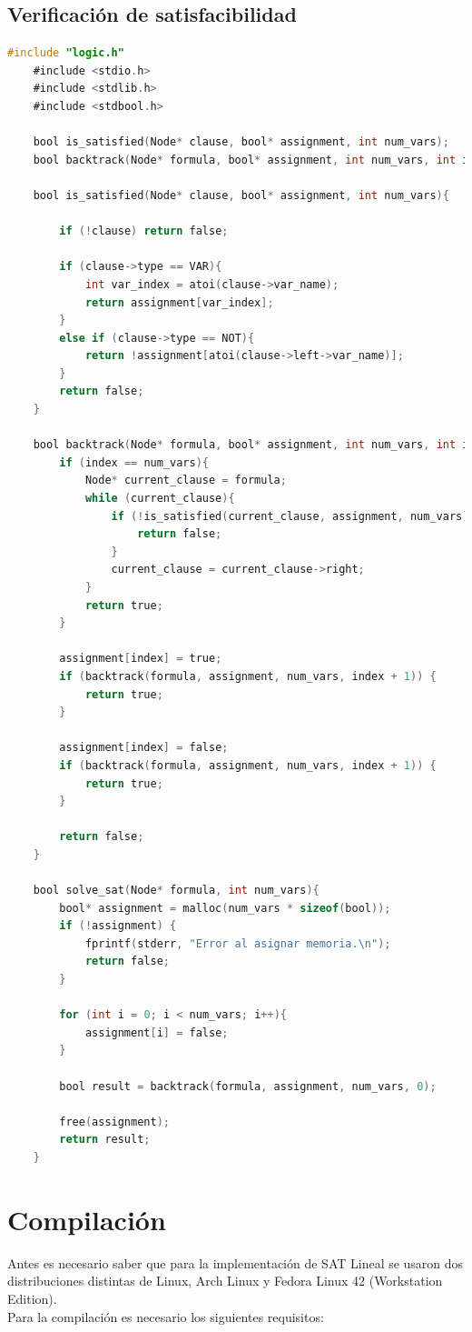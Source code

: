 \documentclass{report}
\begin{document}
	\subsection{Verificaci\'on de satisfacibilidad}
	\begin{lstlisting}[language=C]
	#include "logic.h"
	#include <stdio.h>
	#include <stdlib.h>
	#include <stdbool.h>
	
	bool is_satisfied(Node* clause, bool* assignment, int num_vars);
	bool backtrack(Node* formula, bool* assignment, int num_vars, int index);

	bool is_satisfied(Node* clause, bool* assignment, int num_vars){
		
		if (!clause) return false;
		
		if (clause->type == VAR){
			int var_index = atoi(clause->var_name);
			return assignment[var_index];
		} 
		else if (clause->type == NOT){
			return !assignment[atoi(clause->left->var_name)];
		}
		return false;
	}
	
	bool backtrack(Node* formula, bool* assignment, int num_vars, int index){
		if (index == num_vars){
			Node* current_clause = formula;
			while (current_clause){
				if (!is_satisfied(current_clause, assignment, num_vars)){
					return false;
				}
				current_clause = current_clause->right;
			}
			return true;
		}
		
		assignment[index] = true;
		if (backtrack(formula, assignment, num_vars, index + 1)) {
			return true;
		}
		
		assignment[index] = false;
		if (backtrack(formula, assignment, num_vars, index + 1)) {
			return true;
		}
		
		return false;
	}

	bool solve_sat(Node* formula, int num_vars){
		bool* assignment = malloc(num_vars * sizeof(bool));
		if (!assignment) {
			fprintf(stderr, "Error al asignar memoria.\n");
			return false;
		}
		
		for (int i = 0; i < num_vars; i++){
			assignment[i] = false;
		}
		
		bool result = backtrack(formula, assignment, num_vars, 0);
		
		free(assignment);
		return result;
	}
	\end{lstlisting}
	\newpage
	\section{Compilaci\'on}
	Antes es necesario saber que para la implementaci\'on de SAT Lineal se usaron dos distribuciones distintas de Linux, Arch Linux y Fedora Linux 42 (Workstation Edition). \\
	Para la compilaci\'on es necesario los siguientes requisitos:
\end{document}
